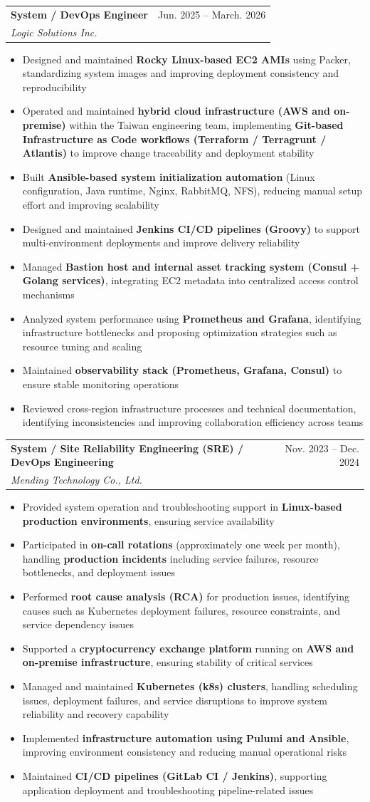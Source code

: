 \documentclass[letterpaper,11pt]{article}
\makeatletter
\newcommand{\resumeItem}[1]{
  \item\small{
    {#1 \vspace{-1pt}}
  }
}
\newcommand{\resumeSubheading}[4]{
  \vspace{-1pt}\item
    \begin{tabular*}{\textwidth}[t]{l@{\extracolsep{\fill}}r}
      \textbf{#1} & {\color{dark-grey}\small #2}\vspace{1pt}\\ %
      \textit{#3} & {\color{dark-grey} \small #4}\\ %
    \end{tabular*}\vspace{-4pt}
}
\newcommand{\resumeItemListStart}{\begin{itemize}}
\newcommand{\resumeItemListEnd}{\end{itemize}\vspace{0pt}}
\makeatother
\begin{document}
\resumeSubheading
  {System / DevOps Engineer}{Jun. 2025 -- March. 2026}
  {Logic Solutions Inc.}{}
  \resumeItemListStart
    \resumeItem{Designed and maintained \textbf{Rocky Linux-based EC2 AMIs} using Packer, standardizing system images and improving deployment consistency and reproducibility}
    \resumeItem{Operated and maintained \textbf{hybrid cloud infrastructure (AWS and on-premise)} within the Taiwan engineering team, implementing \textbf{Git-based Infrastructure as Code workflows (Terraform / Terragrunt / Atlantis)} to improve change traceability and deployment stability}
    \resumeItem{Built \textbf{Ansible-based system initialization automation} (Linux configuration, Java runtime, Nginx, RabbitMQ, NFS), reducing manual setup effort and improving scalability}
    \resumeItem{Designed and maintained \textbf{Jenkins CI/CD pipelines (Groovy)} to support multi-environment deployments and improve delivery reliability}
    \resumeItem{Managed \textbf{Bastion host and internal asset tracking system (Consul + Golang services)}, integrating EC2 metadata into centralized access control mechanisms}
    \resumeItem{Analyzed system performance using \textbf{Prometheus and Grafana}, identifying infrastructure bottlenecks and proposing optimization strategies such as resource tuning and scaling}
    \resumeItem{Maintained \textbf{observability stack (Prometheus, Grafana, Consul)} to ensure stable monitoring operations}
    \resumeItem{Reviewed cross-region infrastructure processes and technical documentation, identifying inconsistencies and improving collaboration efficiency across teams}
  \resumeItemListEnd

\resumeSubheading
  {System / Site Reliability Engineering (SRE) / DevOps Engineering}{Nov. 2023 -- Dec. 2024}
  {Mending Technology Co., Ltd.}{}  
  \resumeItemListStart
    \resumeItem{Provided system operation and troubleshooting support in \textbf{Linux-based production environments}, ensuring service availability}
    \resumeItem{Participated in \textbf{on-call rotations} (approximately one week per month), handling \textbf{production incidents} including service failures, resource bottlenecks, and deployment issues}
    \resumeItem{Performed \textbf{root cause analysis (RCA)} for production issues, identifying causes such as Kubernetes deployment failures, resource constraints, and service dependency issues}
    \resumeItem{Supported a \textbf{cryptocurrency exchange platform} running on \textbf{AWS and on-premise infrastructure}, ensuring stability of critical services}
    \resumeItem{Managed and maintained \textbf{Kubernetes (k8s) clusters}, handling scheduling issues, deployment failures, and service disruptions to improve system reliability and recovery capability}
    \resumeItem{Implemented \textbf{infrastructure automation using Pulumi and Ansible}, improving environment consistency and reducing manual operational risks}
    \resumeItem{Maintained \textbf{CI/CD pipelines (GitLab CI / Jenkins)}, supporting application deployment and troubleshooting pipeline-related issues}
  \resumeItemListEnd
\end{document}
